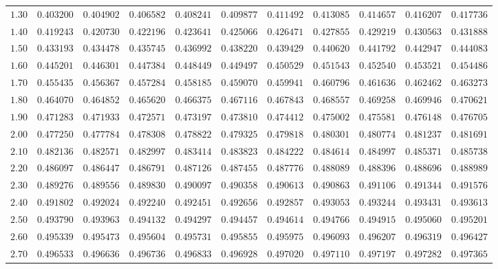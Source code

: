 \begin{tabular}{rrrrrrrrrrr}
  $1.30$ & $0.403200$ & $0.404902$ & $0.406582$ & $0.408241$ & $0.409877$ & $0.411492$ & $0.413085$ & $0.414657$ & $0.416207$ & $0.417736$ \\ 
  $1.40$ & $0.419243$ & $0.420730$ & $0.422196$ & $0.423641$ & $0.425066$ & $0.426471$ & $0.427855$ & $0.429219$ & $0.430563$ & $0.431888$ \\ 
  $1.50$ & $0.433193$ & $0.434478$ & $0.435745$ & $0.436992$ & $0.438220$ & $0.439429$ & $0.440620$ & $0.441792$ & $0.442947$ & $0.444083$ \\ 
  $1.60$ & $0.445201$ & $0.446301$ & $0.447384$ & $0.448449$ & $0.449497$ & $0.450529$ & $0.451543$ & $0.452540$ & $0.453521$ & $0.454486$ \\ 
  $1.70$ & $0.455435$ & $0.456367$ & $0.457284$ & $0.458185$ & $0.459070$ & $0.459941$ & $0.460796$ & $0.461636$ & $0.462462$ & $0.463273$ \\ 
  $1.80$ & $0.464070$ & $0.464852$ & $0.465620$ & $0.466375$ & $0.467116$ & $0.467843$ & $0.468557$ & $0.469258$ & $0.469946$ & $0.470621$ \\ 
  $1.90$ & $0.471283$ & $0.471933$ & $0.472571$ & $0.473197$ & $0.473810$ & $0.474412$ & $0.475002$ & $0.475581$ & $0.476148$ & $0.476705$ \\ 
  $2.00$ & $0.477250$ & $0.477784$ & $0.478308$ & $0.478822$ & $0.479325$ & $0.479818$ & $0.480301$ & $0.480774$ & $0.481237$ & $0.481691$ \\ 
  $2.10$ & $0.482136$ & $0.482571$ & $0.482997$ & $0.483414$ & $0.483823$ & $0.484222$ & $0.484614$ & $0.484997$ & $0.485371$ & $0.485738$ \\ 
  $2.20$ & $0.486097$ & $0.486447$ & $0.486791$ & $0.487126$ & $0.487455$ & $0.487776$ & $0.488089$ & $0.488396$ & $0.488696$ & $0.488989$ \\ 
  $2.30$ & $0.489276$ & $0.489556$ & $0.489830$ & $0.490097$ & $0.490358$ & $0.490613$ & $0.490863$ & $0.491106$ & $0.491344$ & $0.491576$ \\ 
  $2.40$ & $0.491802$ & $0.492024$ & $0.492240$ & $0.492451$ & $0.492656$ & $0.492857$ & $0.493053$ & $0.493244$ & $0.493431$ & $0.493613$ \\ 
  $2.50$ & $0.493790$ & $0.493963$ & $0.494132$ & $0.494297$ & $0.494457$ & $0.494614$ & $0.494766$ & $0.494915$ & $0.495060$ & $0.495201$ \\ 
  $2.60$ & $0.495339$ & $0.495473$ & $0.495604$ & $0.495731$ & $0.495855$ & $0.495975$ & $0.496093$ & $0.496207$ & $0.496319$ & $0.496427$ \\ 
  $2.70$ & $0.496533$ & $0.496636$ & $0.496736$ & $0.496833$ & $0.496928$ & $0.497020$ & $0.497110$ & $0.497197$ & $0.497282$ & $0.497365$ \\ 

\end{tabular}
